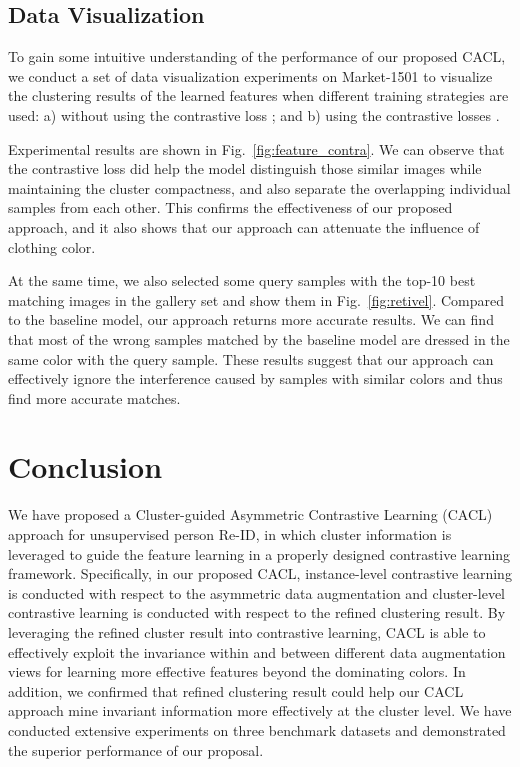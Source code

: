 \documentclass[journal]{IEEEtran}
\begin{document}
\subsection{Data Visualization} 
To gain some intuitive understanding of the performance of our proposed CACL, we conduct a set of data visualization experiments on Market-1501 
to visualize the clustering results of the learned features when different training strategies are used: a) without using the contrastive loss ; and b) using the contrastive losses . 

Experimental results are shown in Fig.~\ref{fig:feature_contra}. We can observe that the contrastive loss  did help the model distinguish those similar images while maintaining the cluster compactness, and also separate the overlapping individual samples from each other. 
This confirms the effectiveness of our proposed approach, and it also shows that our approach can attenuate the influence of clothing color.


At the same time, we also selected some query samples with the top-10 best matching images in the gallery set and show them in Fig.~\ref{fig:retivel}. Compared to the baseline model, our approach returns more accurate results. We can find that most of the wrong samples matched by the baseline model are dressed in the same color with the query sample. These results suggest that our approach can effectively ignore the interference caused by samples with similar colors and thus find more accurate matches.







\section{Conclusion}
\label{sec:conclusion}



We have proposed a Cluster-guided Asymmetric Contrastive Learning (CACL) approach for unsupervised person Re-ID, in which cluster information is leveraged to guide the feature learning in a properly designed contrastive learning framework. Specifically, in our proposed CACL, instance-level contrastive learning is conducted with respect to the asymmetric data augmentation and cluster-level contrastive learning is conducted with respect to the refined clustering result. By leveraging the refined cluster result into contrastive learning, CACL is able to effectively exploit the invariance within and between different data augmentation views for learning more effective features beyond the dominating colors. In addition, we confirmed that refined clustering result could help our CACL approach mine invariant information more effectively at the cluster level. 
We have conducted extensive experiments on three benchmark datasets and demonstrated the superior performance of our proposal. 
\end{document}

